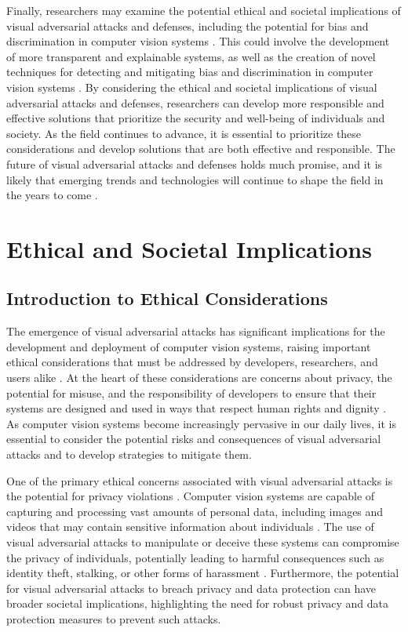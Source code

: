 \documentclass[11pt]{article}
\begin{document}
Finally, researchers may examine the potential ethical and societal implications of visual adversarial attacks and defenses, including the potential for bias and discrimination in computer vision systems \cite{ref149}. This could involve the development of more transparent and explainable systems, as well as the creation of novel techniques for detecting and mitigating bias and discrimination in computer vision systems \cite{ref150}. By considering the ethical and societal implications of visual adversarial attacks and defenses, researchers can develop more responsible and effective solutions that prioritize the security and well-being of individuals and society. As the field continues to advance, it is essential to prioritize these considerations and develop solutions that are both effective and responsible. The future of visual adversarial attacks and defenses holds much promise, and it is likely that emerging trends and technologies will continue to shape the field in the years to come \cite{ref151}.

\section{Ethical and Societal Implications}

\subsection{Introduction to Ethical Considerations}

The emergence of visual adversarial attacks has significant implications for the development and deployment of computer vision systems, raising important ethical considerations that must be addressed by developers, researchers, and users alike \cite{ref128}. At the heart of these considerations are concerns about privacy, the potential for misuse, and the responsibility of developers to ensure that their systems are designed and used in ways that respect human rights and dignity \cite{ref152}. As computer vision systems become increasingly pervasive in our daily lives, it is essential to consider the potential risks and consequences of visual adversarial attacks and to develop strategies to mitigate them.

One of the primary ethical concerns associated with visual adversarial attacks is the potential for privacy violations \cite{ref153}. Computer vision systems are capable of capturing and processing vast amounts of personal data, including images and videos that may contain sensitive information about individuals \cite{ref154}. The use of visual adversarial attacks to manipulate or deceive these systems can compromise the privacy of individuals, potentially leading to harmful consequences such as identity theft, stalking, or other forms of harassment \cite{ref155}. Furthermore, the potential for visual adversarial attacks to breach privacy and data protection can have broader societal implications, highlighting the need for robust privacy and data protection measures to prevent such attacks.
\end{document}
